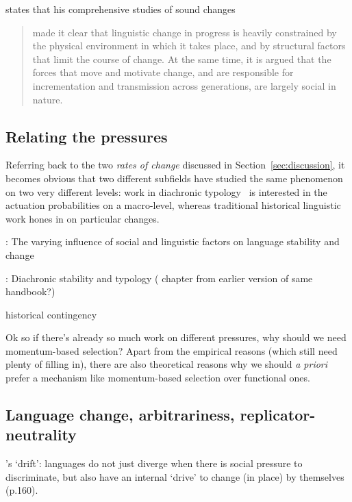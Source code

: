 \citet[p.498]{Labov2001} states that his comprehensive studies of sound changes
\begin{quotation}
made it clear that linguistic change in progress is heavily constrained by the physical environment in which it takes place, and by structural factors that limit the course of change. At the same time, it is argued that the forces that move and motivate change, and are responsible for incrementation and transmission across generations, are largely social in nature.
\end{quotation}

\subsection{Relating the pressures}

Referring back to the two \emph{rates of change} discussed in Section~\ref{sec:discussion}, it becomes obvious that two different subfields have studied the same phenomenon on two very different levels: work in diachronic typology~\citep[such as][]{Bickel2015} is interested in the actuation probabilities on a macro-level, whereas traditional historical linguistic work hones in on particular changes.


\citet{Sundgren2009}: The varying influence of social and linguistic factors on language stability and change

\citet{Wichmann2015}: Diachronic stability and typology (\citet{Nichols2003} chapter from earlier version of same handbook?)

historical contingency~\citep[p.503]{Labov2001} %

Ok so if there's already so much work on different pressures, why should we need momentum-based selection? Apart from the empirical reasons (which still need plenty of filling in), there are also theoretical reasons why we should \emph{a priori} prefer a mechanism like momentum-based selection over functional ones.

\subsection{Language change, arbitrariness, replicator-neutrality}

\citet{Sapir1921}'s `drift': languages do not just diverge when there is social pressure to discriminate, but also have an internal `drive' to change (in place) by themselves (p.160).

